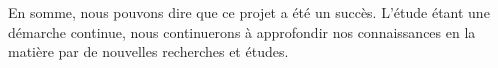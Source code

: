 En somme, nous pouvons dire que ce projet a été un succès. L’étude étant une démarche continue, nous continuerons à approfondir nos connaissances en la matière par de nouvelles recherches et études.
